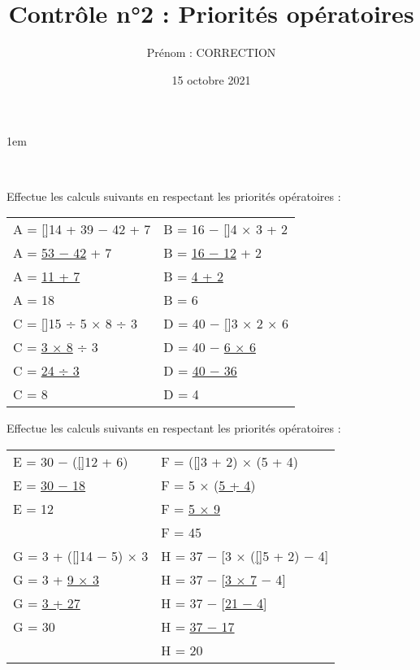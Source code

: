 \documentclass[a4paper,11pt]{article}
\title{Contrôle n°2 : Priorités opératoires}
\date{15 octobre 2021}
\author{Prénom : {\red CORRECTION}}
\makeatletter
\newcommand{\red}{\color{red}}
\renewcommand{\maketitle}{%
    \topskip1em
	\@author \hfill \@date \\

	\begin{center}
		\begin{huge}
			\@title \\[1em]
		\end{huge}
	\end{center}
}
\makeatother
\begin{document}
\maketitle

\begin{question}[(4 points)] Effectue les calculs suivants en respectant les priorités opératoires :

	\noindent
	\begin{tabular}{p{}|p{}}
		A = \uline[\red]{14 + 39} − 42 + 7 & B = 16 − \uline[\red]{4 × 3} + 2 \\
		{\red A = \uline{53 − 42} + 7 }    & {\red B = \uline{16 − 12} + 2}   \\
		{\red A = \uline{11 + 7} }         & {\red B = \uline{4 + 2}}         \\
		{\red A = 18 }                       & {\red B = 6 } \vspace{1em}         \\
		C = \uline[\red]{15 ÷ 5} × 8 ÷ 3   & D = 40 − \uline[\red]{3 × 2} × 6 \\
		{\red C = \uline{3 × 8} ÷ 3}       & {\red D = 40 − \uline{6 × 6}}    \\
		{\red C = \uline{24 ÷ 3}}          & {\red D = \uline{40 − 36}}       \\
		{\red C = 8}                         & {\red D = 4} \vspace{1em}          \\
	\end{tabular}
\end{question}

\begin{question}[(4 points)] Effectue les calculs suivants en respectant les priorités opératoires :

	\noindent
	\begin{tabular}{p{}|p{}}
		E = 30 − (\uline[\red]{12 + 6})    & F = (\uline[\red]{3 + 2}) × (5 + 4)      \\
		{\red E = \uline{30 − 18}}         & {\red F = 5 × (\uline{5 + 4})}           \\
		{\red E = 12}                        & {\red F = \uline{5 × 9}}                 \\
		                                     & {\red F = 45} \vspace{3em}                 \\
		G = 3 + (\uline[\red]{14 − 5}) × 3 & H = 37 − [3 × (\uline[\red]{5 + 2}) − 4] \\
		{\red G = 3 + \uline{9 × 3}}       & {\red H = 37 − [\uline{3 × 7} − 4]}      \\
		{\red G = \uline{3 + 27}}          & {\red H = 37 − [\uline{21 − 4}]}         \\
		{\red G = 30}                        & {\red H = \uline{37 − 17}}               \\
		{}                                   & {\red H = 20} \vspace{1em}                 \\
	\end{tabular}
\end{question}
\end{document}
